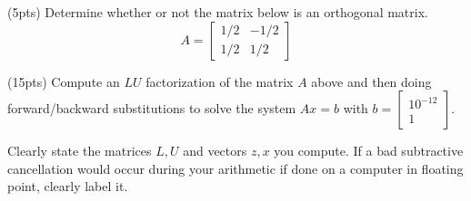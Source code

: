\documentclass[11pt]{article}
\newenvironment{problem}[2][Q]{\begin{trivlist}
\item[\hskip \labelsep {\bfseries #1}{\bfseries #2}]}{\end{trivlist}}
\theoremstyle{definition}
\begin{document}
\newpage



\begin{problem}{3. ($LU$ factorizations and Subtractive Cancellations by Hand, 20pts)} (5pts) Determine whether or not the matrix below is an orthogonal matrix.
$$A = \begin{bmatrix*}1/2 & -1/2 \\ 1/2 & 1/2\end{bmatrix*}$$

(15pts) Compute an $LU$ factorization of the matrix $A$ above and then doing forward/backward substitutions to solve the system $Ax = b$ with $b = \begin{bmatrix*}10^{-12} \\ 1\end{bmatrix*}$.

Clearly state the matrices $L, U$ and vectors $z, x$ you compute. If a bad subtractive cancellation would occur during your arithmetic if done on a computer in floating point, clearly label it.
\end{problem}
\end{document}
